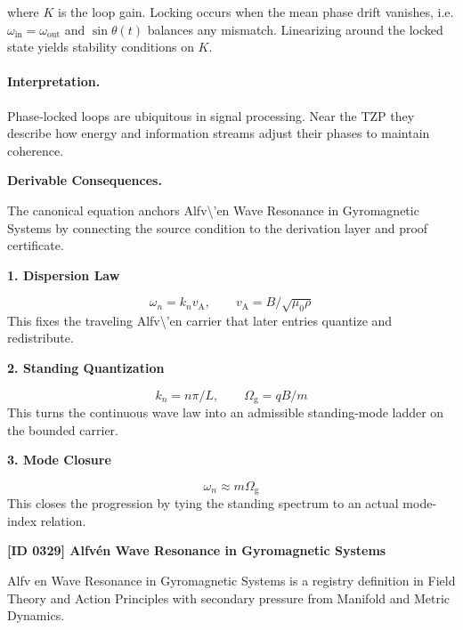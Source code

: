 where $K$ is the loop gain.  Locking occurs when the mean phase drift vanishes, i.e. $\omega_{\mathrm{in}} = \omega_{\mathrm{out}}$ and $\sin\theta(t)$ balances any mismatch.
Linearizing around the locked state yields stability conditions on $K$.

\paragraph{Interpretation.}

Phase‑locked loops are ubiquitous in signal processing.  Near the TZP they describe how energy and information streams adjust their phases to maintain coherence.

\par\vspace{0.35em}
\noindent\textbf{Derivable Consequences.}\quad
\begingroup
\footnotesize
\raggedright
The canonical equation anchors Alfv\textbackslash{}'en Wave Resonance in Gyromagnetic Systems by connecting the source condition to the derivation layer and proof certificate.
\par\endgroup

\noindent\textbf{1. Dispersion Law}\par
\[
\omega_{n}=k_{n}v_{\mathrm{A}},\qquad v_{\mathrm{A}}=B/\sqrt{\mu_{0}\rho}
\]
\noindent This fixes the traveling Alfv\textbackslash{}'en carrier that later entries quantize and redistribute.\par
\noindent\textbf{2. Standing Quantization}\par
\[
k_{n}=n\pi/L,\qquad \Omega_{\mathrm{g}}=qB/m
\]
\noindent This turns the continuous wave law into an admissible standing-mode ladder on the bounded carrier.\par
\noindent\textbf{3. Mode Closure}\par
\[
\omega_{n}\approx m\Omega_{\mathrm{g}}
\]
\noindent This closes the progression by tying the standing spectrum to an actual mode-index relation.\par

\clearpage
\noindent\textbf{[ID 0329] Alfv\'en Wave Resonance in Gyromagnetic Systems}\par
\vspace{0.35em}
\begingroup\small
{}
Alfv en Wave Resonance in Gyromagnetic Systems is a registry definition in Field Theory and Action Principles with secondary pressure from Manifold and Metric Dynamics.

